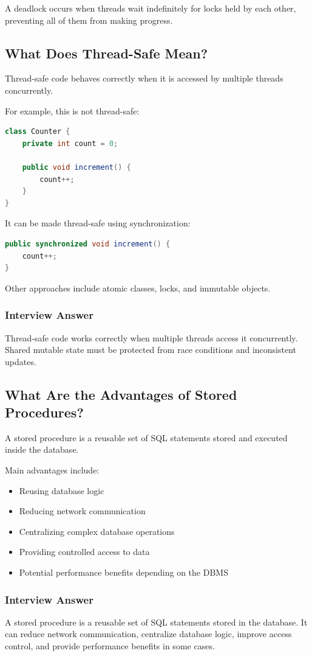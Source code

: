 \documentclass[12pt,a4paper]{article}
\begin{document}
A deadlock occurs when threads wait indefinitely for locks held by each
other, preventing all of them from making progress.

\subsection{What Does Thread-Safe Mean?}

Thread-safe code behaves correctly when it is accessed by multiple threads
concurrently.

For example, this is not thread-safe:

\begin{lstlisting}[language=Java]
class Counter {
    private int count = 0;

    public void increment() {
        count++;
    }
}
\end{lstlisting}

It can be made thread-safe using synchronization:

\begin{lstlisting}[language=Java]
public synchronized void increment() {
    count++;
}
\end{lstlisting}

Other approaches include atomic classes, locks, and immutable objects.

\subsubsection*{Interview Answer}

Thread-safe code works correctly when multiple threads access it
concurrently. Shared mutable state must be protected from race conditions
and inconsistent updates.

\subsection{What Are the Advantages of Stored Procedures?}

A stored procedure is a reusable set of SQL statements stored and executed
inside the database.

Main advantages include:

\begin{itemize}
    \item Reusing database logic
    \item Reducing network communication
    \item Centralizing complex database operations
    \item Providing controlled access to data
    \item Potential performance benefits depending on the DBMS
\end{itemize}

\subsubsection*{Interview Answer}

A stored procedure is a reusable set of SQL statements stored in the
database. It can reduce network communication, centralize database logic,
improve access control, and provide performance benefits in some cases.
\end{document}
